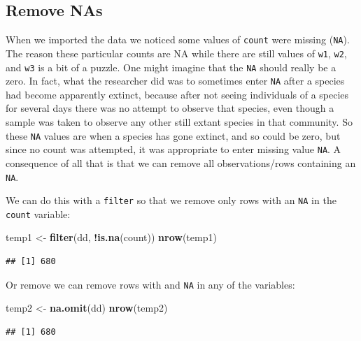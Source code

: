 \documentclass[]{book}
\newenvironment{Shaded}{\begin{snugshade}}{\end{snugshade}}
\newcommand{\KeywordTok}[1]{\textcolor[rgb]{0.13,0.29,0.53}{\textbf{#1}}}
\newcommand{\NormalTok}[1]{#1}
\newcommand{\OperatorTok}[1]{\textcolor[rgb]{0.81,0.36,0.00}{\textbf{#1}}}
\newcommand{\StringTok}[1]{\textcolor[rgb]{0.31,0.60,0.02}{#1}}
\begin{document}
\hypertarget{remove-nas}{%
\subsection{Remove NAs}\label{remove-nas}}

When we imported the data we noticed some values of \texttt{count} were missing (\texttt{NA}). The reason these particular counts are NA while there are still values of \texttt{w1}, \texttt{w2}, and \texttt{w3} is a bit of a puzzle. One might imagine that the \texttt{NA} should really be a zero. In fact, what the researcher did was to sometimes enter \texttt{NA} after a species had become apparently extinct, because after not seeing individuals of a species for several days there was no attempt to observe that species, even though a sample was taken to observe any other still extant species in that community. So these \texttt{NA} values are when a species has gone extinct, and so could be zero, but since no count was attempted, it was appropriate to enter missing value \texttt{NA}. A consequence of all that is that we can remove all observations/rows containing an \texttt{NA}.

We can do this with a \texttt{filter} so that we remove only rows with an \texttt{NA} in the \texttt{count} variable:

\begin{Shaded}
\begin{Highlighting}[]
\NormalTok{temp1 <-}\StringTok{ }\KeywordTok{filter}\NormalTok{(dd, }\OperatorTok{!}\KeywordTok{is.na}\NormalTok{(count))}
\KeywordTok{nrow}\NormalTok{(temp1)}
\end{Highlighting}
\end{Shaded}

\begin{verbatim}
## [1] 680
\end{verbatim}

Or remove we can remove rows with and \texttt{NA} in any of the variables:

\begin{Shaded}
\begin{Highlighting}[]
\NormalTok{temp2 <-}\StringTok{ }\KeywordTok{na.omit}\NormalTok{(dd)}
\KeywordTok{nrow}\NormalTok{(temp2)}
\end{Highlighting}
\end{Shaded}

\begin{verbatim}
## [1] 680
\end{verbatim}
\end{document}
